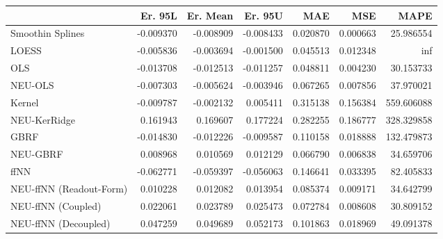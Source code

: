 \begin{tabular}{lrrrrrr}
\toprule
{} &   Er. 95L &  Er. Mean &   Er. 95U &       MAE &       MSE &        MAPE \\
\midrule
Smoothin Splines        & -0.009370 & -0.008909 & -0.008433 &  0.020870 &  0.000663 &   25.986554 \\
LOESS                   & -0.005836 & -0.003694 & -0.001500 &  0.045513 &  0.012348 &         inf \\
OLS                     & -0.013708 & -0.012513 & -0.011257 &  0.048811 &  0.004230 &   30.153733 \\
NEU-OLS                 & -0.007303 & -0.005624 & -0.003946 &  0.067265 &  0.007856 &   37.970021 \\
Kernel                  & -0.009787 & -0.002132 &  0.005411 &  0.315138 &  0.156384 &  559.606088 \\
NEU-KerRidge            &  0.161943 &  0.169607 &  0.177224 &  0.282255 &  0.186777 &  328.329858 \\
GBRF                    & -0.014830 & -0.012226 & -0.009587 &  0.110158 &  0.018888 &  132.479873 \\
NEU-GBRF                &  0.008968 &  0.010569 &  0.012129 &  0.066790 &  0.006838 &   34.659706 \\
ffNN                    & -0.062771 & -0.059397 & -0.056063 &  0.146641 &  0.033395 &   82.405833 \\
NEU-ffNN (Readout-Form) &  0.010228 &  0.012082 &  0.013954 &  0.085374 &  0.009171 &   34.642799 \\
NEU-ffNN (Coupled)      &  0.022061 &  0.023789 &  0.025473 &  0.072784 &  0.008608 &   30.809152 \\
NEU-ffNN (Decoupled)    &  0.047259 &  0.049689 &  0.052173 &  0.101863 &  0.018969 &   49.091378 \\
\bottomrule
\end{tabular}
